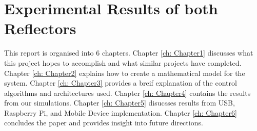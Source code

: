\section{Experimental Results of both Reflectors}
This report is organised into 6 chapters.  Chapter \ref{ch: Chapter1} discusses what this project hopes to accomplish and what similar projects have completed.  Chapter \ref{ch: Chapter2} explains how to create a mathematical model for the system.  Chapter \ref{ch: Chapter3} provides a breif explanation of the control algorithms and architectures used.  Chapter \ref{ch: Chapter4} contains the results from our simulations.  Chapter \ref{ch: Chapter5} disucsses results from USB, Raspberry Pi, and Mobile Device implementation.  Chapter \ref{ch: Chapter6} concludes the paper and provides insight into future directions.

